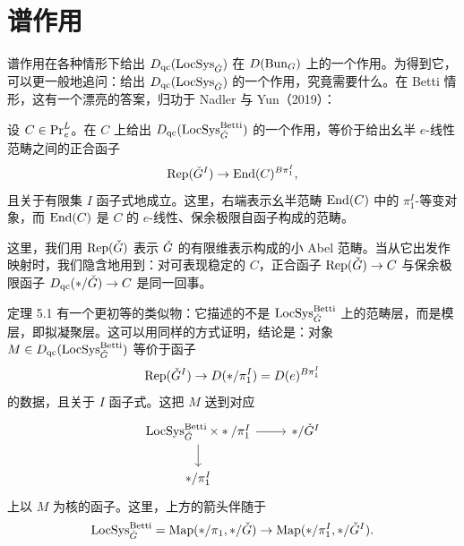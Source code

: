 \section{谱作用}

谱作用在各种情形下给出 $D_{\mathrm{qc}}(\operatorname{LocSys}_{\check{G}})$ 在 $D(\operatorname{Bun}_G)$ 上的一个作用。为得到它，可以更一般地追问：给出 $D_{\mathrm{qc}}(\operatorname{LocSys}_{\check{G}})$ 的一个作用，究竟需要什么。在 Betti 情形，这有一个漂亮的答案，归功于 Nadler 与 Yun（2019）：

\begin{theorem}
设 $C\in\mathrm{Pr}^{L}_{\mathit{e}}$。在 $C$ 上给出 $D_{\mathrm{qc}}(\operatorname{LocSys}^{\mathrm{Betti}}_{\check{G}})$ 的一个作用，等价于给出幺半 $e$-线性范畴之间的正合函子
\[
\operatorname{Rep}(\check{G}^I)\to\operatorname{End}(C)^{B\pi_1^I},
\]
且关于有限集 $I$ 函子式地成立。这里，右端表示幺半范畴 $\operatorname{End}(C)$ 中的 $\pi_1^I$-等变对象，而 $\operatorname{End}(C)$ 是 $C$ 的 $e$-线性、保余极限自函子构成的范畴。
\end{theorem}

这里，我们用 $\operatorname{Rep}(\check{G})$ 表示 $\check{G}$ 的有限维表示构成的小 Abel 范畴。当从它出发作映射时，我们隐含地用到：对可表现稳定的 $C$，正合函子 $\operatorname{Rep}(\check{G})\to C$ 与保余极限函子 $D_{\mathrm{qc}}(\ast/\check{G})\to C$ 是同一回事。

\begin{remark}
定理 5.1 有一个更初等的类似物：它描述的不是 $\operatorname{LocSys}^{\mathrm{Betti}}_{\check{G}}$ 上的范畴层，而是模层，即拟凝聚层。这可以用同样的方式证明，结论是：对象 $M\in D_{\mathrm{qc}}(\operatorname{LocSys}^{\mathrm{Betti}}_{\check{G}})$ 等价于函子
\[
\operatorname{Rep}(\check{G}^I)\to D(\ast/\pi_1^I)=D(e)^{B\pi_1^I}
\]
的数据，且关于 $I$ 函子式。这把 $M$ 送到对应
\[
\begin{tikzcd}
\LocSys^{\Betti}_{\Gd}\times\ast/\pi_1^I \arrow[r] \arrow[d] & \ast/\Gd^I \\
\ast/\pi_1^I
\end{tikzcd}
\]
上以 $M$ 为核的函子。这里，上方的箭头伴随于
\[
\operatorname{LocSys}^{\mathrm{Betti}}_{\check{G}}=\operatorname{Map}(\ast/\pi_1,\ast/\check{G})\to\operatorname{Map}(\ast/\pi_1^I,\ast/\check{G}^I).
\]
\end{remark}

